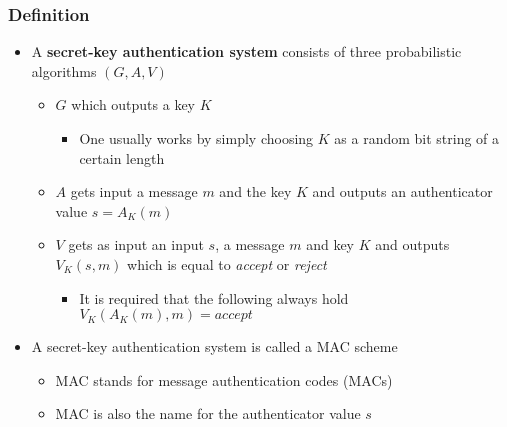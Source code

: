 \subsubsection{Definition}
\begin{itemize}
  \item A \textbf{secret-key authentication system} consists of three probabilistic algorithms $(G,A,V)$
  \begin{itemize}
  	\item $G$ which outputs a key $K$
    \begin{itemize}
  		\item One usually works by simply choosing $K$ as a random bit string of a certain length
    \end{itemize}
  	\item $A$ gets input a message $m$ and the key $K$ and outputs an authenticator value $s = A_K(m)$
  	\item $V$ gets as input an input $s$, a message $m$ and key $K$ and outputs $V_K(s,m)$ which is equal to \textit{accept} or \textit{reject} 
    \begin{itemize}
  		\item It is required that the following always hold $V_K(A_K(m),m) = accept$
    \end{itemize}
  \end{itemize}

  \item A secret-key authentication system is called a MAC scheme
  \begin{itemize}
  	\item MAC stands for message authentication codes (MACs)
  	\item MAC is also the name for the authenticator value $s$
  \end{itemize}
\end{itemize}

